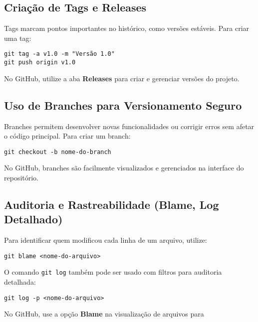 \subsection{Criação de Tags e Releases}

Tags marcam pontos importantes no histórico, como versões estáveis. Para criar uma tag:

\begin{lstlisting}[style=shellstyle]
git tag -a v1.0 -m "Versão 1.0"
git push origin v1.0
\end{lstlisting}

No GitHub, utilize a aba \textbf{Releases} para criar e gerenciar versões do projeto.

\subsection{Uso de Branches para Versionamento Seguro}

Branches permitem desenvolver novas funcionalidades ou corrigir erros sem afetar o código principal. Para criar um branch:

\begin{lstlisting}[style=shellstyle]
git checkout -b nome-do-branch
\end{lstlisting}

No GitHub, branches são facilmente visualizados e gerenciados na interface do repositório.

\subsection{Auditoria e Rastreabilidade (Blame, Log Detalhado)}

Para identificar quem modificou cada linha de um arquivo, utilize:

\begin{lstlisting}[style=shellstyle]
git blame <nome-do-arquivo>
\end{lstlisting}

O comando \texttt{git log} também pode ser usado com filtros para auditoria detalhada:

\begin{lstlisting}[style=shellstyle]
git log -p <nome-do-arquivo>
\end{lstlisting}

No GitHub, use a opção \textbf{Blame} na visualização de arquivos para